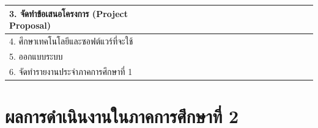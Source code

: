 \documentclass[12pt,oneside,openright,a4paper]{cpe-thai-project}
\begin{document}
\begin{table}[h]
\begin{tabular}{|lllll|llll|llll|llll|llll|llll|}
\multicolumn{5}{|l|}{3. จัดทําข้อเสนอโครงการ (Project Proposal)} & \multicolumn{1}{l|}{} & \multicolumn{1}{l|}{} & \multicolumn{1}{l|}{} & \cellcolor[HTML]{C0C0C0}{\color[HTML]{C0C0C0} } & \multicolumn{1}{l|}{\cellcolor[HTML]{C0C0C0}{\color[HTML]{C0C0C0} }} & \multicolumn{1}{l|}{} & \multicolumn{1}{l|}{} &  & \multicolumn{1}{l|}{} & \multicolumn{1}{l|}{} & \multicolumn{1}{l|}{} &  & \multicolumn{1}{l|}{} & \multicolumn{1}{l|}{} & \multicolumn{1}{l|}{} &  & \multicolumn{1}{l|}{} & \multicolumn{1}{l|}{} & \multicolumn{1}{l|}{} &  \\ \hline
\multicolumn{5}{|l|}{4. ศึกษาเทคโนโลยีและซอฟต์แวร์ที่จะใช้} & \multicolumn{1}{l|}{} & \multicolumn{1}{l|}{} & \multicolumn{1}{l|}{} &  & \multicolumn{1}{l|}{\cellcolor[HTML]{C0C0C0}} & \multicolumn{1}{l|}{\cellcolor[HTML]{C0C0C0}} & \multicolumn{1}{l|}{\cellcolor[HTML]{C0C0C0}} & \cellcolor[HTML]{C0C0C0} & \multicolumn{1}{l|}{\cellcolor[HTML]{C0C0C0}} & \multicolumn{1}{l|}{} & \multicolumn{1}{l|}{} &  & \multicolumn{1}{l|}{} & \multicolumn{1}{l|}{} & \multicolumn{1}{l|}{} &  & \multicolumn{1}{l|}{} & \multicolumn{1}{l|}{} & \multicolumn{1}{l|}{} &  \\ \hline
\multicolumn{5}{|l|}{5. ออกแบบระบบ} & \multicolumn{1}{l|}{} & \multicolumn{1}{l|}{} & \multicolumn{1}{l|}{} &  & \multicolumn{1}{l|}{} & \multicolumn{1}{l|}{} & \multicolumn{1}{l|}{} &  & \multicolumn{1}{l|}{\cellcolor[HTML]{C0C0C0}{\color[HTML]{C0C0C0} }} & \multicolumn{1}{l|}{\cellcolor[HTML]{C0C0C0}{\color[HTML]{C0C0C0} }} & \multicolumn{1}{l|}{\cellcolor[HTML]{C0C0C0}{\color[HTML]{C0C0C0} }} & \cellcolor[HTML]{C0C0C0}{\color[HTML]{C0C0C0} } & \multicolumn{1}{l|}{} & \multicolumn{1}{l|}{} & \multicolumn{1}{l|}{} &  & \multicolumn{1}{l|}{} & \multicolumn{1}{l|}{} & \multicolumn{1}{l|}{} &  \\ \hline
\multicolumn{5}{|l|}{6. จัดทํารายงานประจําภาคการศึกษาที่ 1} & \multicolumn{1}{l|}{} & \multicolumn{1}{l|}{} & \multicolumn{1}{l|}{} &  & \multicolumn{1}{l|}{} & \multicolumn{1}{l|}{} & \multicolumn{1}{l|}{} &  & \multicolumn{1}{l|}{} & \multicolumn{1}{l|}{} & \multicolumn{1}{l|}{} & \cellcolor[HTML]{C0C0C0} & \multicolumn{1}{l|}{\cellcolor[HTML]{C0C0C0}} & \multicolumn{1}{l|}{\cellcolor[HTML]{C0C0C0}} & \multicolumn{1}{l|}{\cellcolor[HTML]{C0C0C0}} &  & \multicolumn{1}{l|}{} & \multicolumn{1}{l|}{} & \multicolumn{1}{l|}{} &  \\ \hline
\end{tabular}
\end{table}
\section{ผลการดําเนินงานในภาคการศึกษาที่ 2}
\end{document}
